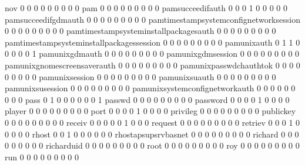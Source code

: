 \documentclass[compress,8pt]{beamer}
\begin{document}
\begin{frame}
\begin{Schunk}
  nov                                        0   0   0   0   0   0   0   0   0
  pam                                        0   0   0   0   0   0   0   0   0
  pamsucceedifauth                           0   0   0   1   0   0   0   0   0
  pamsucceedifgdmauth                        0   0   0   0   0   0   0   0   0
  pamtimestampsystemconfignetworksession     0   0   0   0   0   0   0   0   0
  pamtimestampsysteminstallpackagesauth      0   0   0   0   0   0   0   0   0
  pamtimestampsysteminstallpackagessession   0   0   0   0   0   0   0   0   0
  pamunixauth                                0   1   1   0   0   0   0   0   1
  pamunixgdmauth                             0   0   0   0   0   0   0   0   0
  pamunixgdmsession                          0   0   0   0   0   0   0   0   0
  pamunixgnomescreensaverauth                0   0   0   0   0   0   0   0   0
  pamunixpasswdchauthtok                     0   0   0   0   0   0   0   0   0
  pamunixsession                             0   0   0   0   0   0   0   0   0
  pamunixsuauth                              0   0   0   0   0   0   0   0   0
  pamunixsusession                           0   0   0   0   0   0   0   0   0
  pamunixsystemconfignetworkauth             0   0   0   0   0   0   0   0   0
  pass                                       0   1   0   0   0   0   0   0   1
  passwd                                     0   0   0   0   0   0   0   0   0
  password                                   0   0   0   0   1   0   0   0   0
  player                                     0   0   0   0   0   0   0   0   0
  port                                       0   0   0   0   1   0   0   0   0
  privileg                                   0   0   0   0   0   0   0   0   0
  publickey                                  0   0   0   0   0   0   0   0   0
  receiv                                     0   0   0   0   0   1   0   0   0
  request                                    0   0   0   0   0   0   0   0   0
  retriev                                    0   0   0   1   0   0   0   0   0
  rhost                                      0   0   1   0   0   0   0   0   0
  rhostapsupsrvbasnet                        0   0   0   0   0   0   0   0   0
  richard                                    0   0   0   0   0   0   0   0   0
  richarduid                                 0   0   0   0   0   0   0   0   0
  root                                       0   0   0   0   0   0   0   0   0
  roy                                        0   0   0   0   0   0   0   0   0
  run                                        0   0   0   0   0   0   0   0   0

\end{Schunk}
\end{frame}
\end{document}
